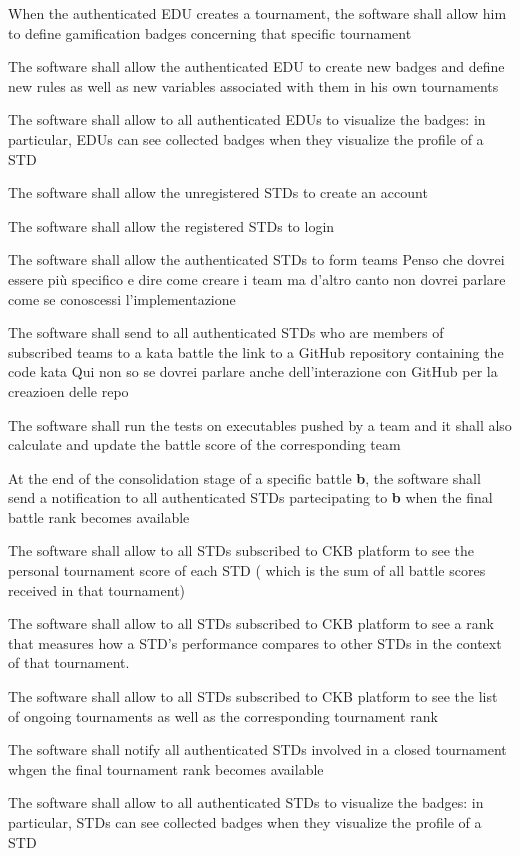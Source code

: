 \begin{requirementsenumerate}
        \item When the authenticated EDU creates a tournament, the software shall allow him to define gamification badges concerning that specific tournament 
        \item The software shall allow the authenticated EDU to create new badges and define new rules as well as new variables associated with them in his own tournaments
        \item The software shall allow to all authenticated EDUs to visualize the badges: in particular, EDUs can see collected badges when they visualize the profile of a STD
        \item The software shall allow the unregistered STDs to create an account
        \item The software shall allow the registered STDs to login
        \item The software shall allow the authenticated STDs to form teams {\color{red} Penso che dovrei essere più specifico e dire come creare i team ma d'altro canto non dovrei parlare come se conoscessi l'implementazione}
        \item The software shall send to all authenticated STDs who are members of subscribed teams to a kata battle the link to a GitHub repository containing the code kata {\color{red} Qui non so se dovrei parlare anche dell'interazione con GitHub per la creazioen delle repo}
        \item The software shall run the tests on executables pushed by a team and it shall also calculate and update the battle score of the corresponding team 
        \item At the end of the consolidation stage of a specific battle \textbf{b}, the software shall send a notification to all authenticated STDs partecipating to \textbf{b} when the final battle rank becomes available
        \item The software shall allow to all STDs subscribed to CKB platform to see the personal tournament score of each STD ( which is the sum of all battle scores received in that tournament) 
        \item The software shall allow to all STDs subscribed to CKB platform to see a rank that measures how a STD's performance compares to other STDs in the context of that tournament. 
        \item The software shall allow to all STDs subscribed to CKB platform to see the list of ongoing tournaments as well as the corresponding tournament rank  
        \item The software shall notify all authenticated STDs involved in a closed tournament whgen the final tournament rank becomes available
        \item The software shall allow to all authenticated STDs to visualize the badges: in particular, STDs can see collected badges when they visualize the profile of a STD
\end{requirementsenumerate}


